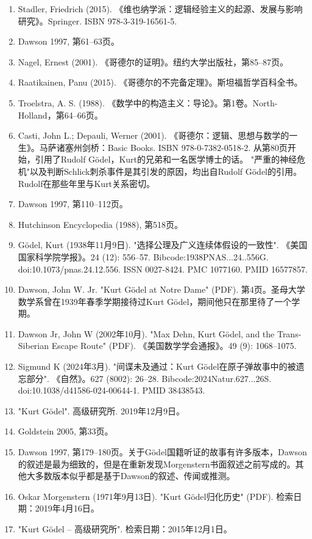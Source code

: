 \begin{enumerate}
\item Stadler, Friedrich (2015). 《维也纳学派：逻辑经验主义的起源、发展与影响研究》。Springer. ISBN 978-3-319-16561-5.  
\item Dawson 1997, 第61–63页。  
\item Nagel, Ernest (2001). 《哥德尔的证明》。纽约大学出版社，第85–87页。  
\item Raatikainen, Panu (2015). 《哥德尔的不完备定理》。斯坦福哲学百科全书。  
\item Troelstra, A. S. (1988). 《数学中的构造主义：导论》。第1卷。North-Holland，第64–66页。  
\item Casti, John L.; Depauli, Werner (2001). 《哥德尔：逻辑、思想与数学的一生》。马萨诸塞州剑桥：Basic Books. ISBN 978-0-7382-0518-2. 从第80页开始，引用了Rudolf Gödel，Kurt的兄弟和一名医学博士的话。 "严重的神经危机"以及判断Schlick刺杀事件是其引发的原因，均出自Rudolf Gödel的引用。Rudolf在那些年里与Kurt关系密切。  
\item Dawson 1997, 第110–112页。  
\item Hutchinson Encyclopedia (1988), 第518页。  
\item Gödel, Kurt (1938年11月9日). "选择公理及广义连续体假设的一致性". 《美国国家科学院学报》。24 (12): 556–57. Bibcode:1938PNAS...24..556G. doi:10.1073/pnas.24.12.556. ISSN 0027-8424. PMC 1077160. PMID 16577857.
\item Dawson, John W. Jr. "Kurt Gödel at Notre Dame" (PDF). 第4页。圣母大学数学系曾在1939年春季学期接待过Kurt Gödel，期间他只在那里待了一个学期。  
\item Dawson Jr, John W (2002年10月). "Max Dehn, Kurt Gödel, and the Trans-Siberian Escape Route" (PDF). 《美国数学学会通报》。49 (9): 1068–1075.  
\item Sigmund K (2024年3月). "间谍未及通过：Kurt Gödel在原子弹故事中的被遗忘部分". 《自然》。627 (8002): 26–28. Bibcode:2024Natur.627...26S. doi:10.1038/d41586-024-00644-1. PMID 38438543.  
\item "Kurt Gödel". 高级研究所. 2019年12月9日。  
\item Goldstein 2005, 第33页。  
\item Dawson 1997, 第179–180页。关于Gödel国籍听证的故事有许多版本，Dawson的叙述是最为细致的，但是在重新发现Morgenstern书面叙述之前写成的。其他大多数版本似乎都是基于Dawson的叙述、传闻或推测。  
\item Oskar Morgenstern (1971年9月13日). "Kurt Gödel归化历史" (PDF). 检索日期：2019年4月16日。
\item "Kurt Gödel – 高级研究所". 检索日期：2015年12月1日。  

\end{enumerate}
